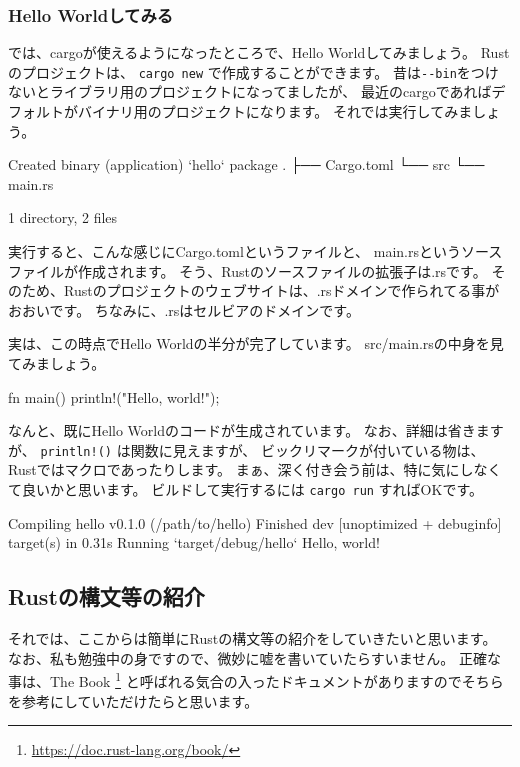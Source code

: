 \documentclass[mingoth,a4paper]{jsarticle}
\begin{document}
\subsubsection{Hello Worldしてみる}

では、cargoが使えるようになったところで、Hello Worldしてみましょう。
Rustのプロジェクトは、 \verb|cargo new| で作成することができます。
昔は\verb|--bin|をつけないとライブラリ用のプロジェクトになってましたが、
最近のcargoであればデフォルトがバイナリ用のプロジェクトになります。
それでは実行してみましょう。

\begin{commandline}
     Created binary (application) `hello` package
.
├── Cargo.toml
└── src
    └── main.rs

1 directory, 2 files
\end{commandline}

実行すると、こんな感じにCargo.tomlというファイルと、
main.rsというソースファイルが作成されます。
そう、Rustのソースファイルの拡張子は.rsです。
そのため、Rustのプロジェクトのウェブサイトは、.rsドメインで作られてる事がおおいです。
ちなみに、.rsはセルビアのドメインです。

実は、この時点でHello Worldの半分が完了しています。
src/main.rsの中身を見てみましょう。

\begin{commandline}
fn main() {
    println!("Hello, world!");
}
\end{commandline}

なんと、既にHello Worldのコードが生成されています。
なお、詳細は省きますが、 \verb|println!()| は関数に見えますが、
ビックリマークが付いている物は、Rustではマクロであったりします。
まぁ、深く付き会う前は、特に気にしなくて良いかと思います。
ビルドして実行するには \verb|cargo run| すればOKです。

\begin{commandline}
   Compiling hello v0.1.0 (/path/to/hello)
    Finished dev [unoptimized + debuginfo] target(s) in 0.31s
     Running `target/debug/hello`
Hello, world!
\end{commandline}

\subsection{Rustの構文等の紹介}

それでは、ここからは簡単にRustの構文等の紹介をしていきたいと思います。
なお、私も勉強中の身ですので、微妙に嘘を書いていたらすいません。
正確な事は、The Book%
\footnote{\url{https://doc.rust-lang.org/book/}}%
と呼ばれる気合の入ったドキュメントがありますのでそちらを参考にしていただけたらと思います。
\end{document}
